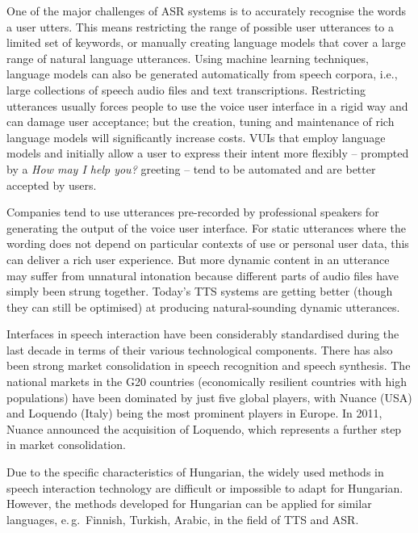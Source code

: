 \begin{multicols}{2}
  One of the major challenges of ASR systems is to accurately recognise the words a user utters. This means restricting the range of possible user utterances to a limited set of keywords, or manually creating language models that cover a large range of natural language utterances. Using machine learning techniques, language models can also be generated automatically from speech corpora, i.e., large collections of speech audio files and text transcriptions. Restricting utterances usually forces people to use the voice user interface in a rigid way and can damage user acceptance; but the creation, tuning and maintenance of rich language models will significantly increase costs. VUIs that employ language models and initially allow a user to express their intent more flexibly -- prompted by a \textit{How may I help you?} greeting -- tend to be automated and are better accepted by users.


  Companies tend to use utterances pre-recorded by professional speakers for generating the output of the voice user interface. For static utterances where the wording does not depend on particular contexts of use or personal user data, this can deliver a rich user experience. But more dynamic content in an utterance may suffer from unnatural intonation because different parts of audio files have simply been strung together. Today's TTS systems are getting better (though they can still be optimised) at producing natural-sounding dynamic utterances. 

  Interfaces in speech interaction have been considerably standardised during the last decade in terms of their various technological components. There has also been strong market consolidation in speech recognition and speech synthesis. The national markets in the G20 countries (economically resilient countries with high populations) have been dominated by just five global players, with Nuance (USA) and Loquendo (Italy) being the most prominent players in Europe. In 2011, Nuance announced the acquisition of Loquendo, which represents a further step in market consolidation.

  Due to the specific characteristics of Hungarian, the widely used methods in speech interaction technology are difficult or impossible to adapt for Hungarian. However, the methods developed for Hungarian can be applied for similar languages, e.\,g.~Finnish, Turkish, Arabic, in the field of TTS and ASR. 


\end{multicols}
